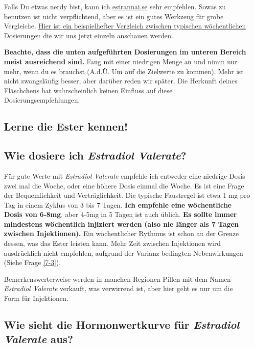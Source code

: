 \documentclass{article}
\begin{document}
{Falls Du etwas nerdy bist, kann ich \href{http://estrannai.se}{estrannai.se} sehr empfehlen. Sowas zu benutzen ist nicht verpflichtend, aber es ist ein gutes Werkzeug für grobe Vergleiche. \href{https://estrannai.se/\#i0__cu,7,7,1-cu,5,7,3-cu,5,7,2}{Hier ist ein beispielhefter Vergleich zwischen typischen wöchentlichen Dosierungen} die wir uns jetzt einzeln anschauen werden.

\textbf{Beachte, dass die unten aufgeführten Dosierungen im unteren Bereich meist ausreichend sind.} Fang mit einer niedrigen Menge an und nimm nur mehr, wenn du es brauchst (A.d.Ü. Um auf die Zielwerte zu kommen). Mehr ist nicht zwangsläufig besser, aber darüber reden wir später. Die Herkunft deines Fläschchens hat wahrscheinlich keinen Einfluss auf diese Dosierungsempfehlungen.

\subsection*{Lerne die Ester kennen!}

\subsection{Wie dosiere ich \textit{Estradiol Valerate}?}

Für gute Werte mit \textit{Estradiol Valerate} empfehle ich entweder eine niedrige Dosis zwei mal die Woche, oder eine höhere Dosis einmal die Woche. Es ist eine Frage der Bequemlichkeit und Verträglichkeit. Die typische Faustregel ist etwa 1 mg pro Tag in einem Zyklus von 3 bis 7 Tagen. \textbf{Ich empfehle eine wöchentliche Dosis von 6-8mg}, aber 4-5mg in  5 Tagen ist auch üblich. \textbf{Es sollte immer mindestens wöchentlich injiziert werden (also nie länger als 7 Tagen zwischen Injektionen).} Ein wöchentlicher Rythmus ist schon an der Grenze dessen, was das Ester leisten kann. Mehr Zeit zwischen Injektionen wird ausdrücklich nicht empfohlen, aufgrund der Varianz-bedingten Nebenwirkungen (Siehe Frage \ref{7-3}).

Bemerkenswerterweise werden in manchen Regionen Pillen mit dem Namen \textit{Estradiol Valerate} verkauft, was verwirrend ist, aber hier geht es nur um die Form für Injektionen.

\subsection{Wie sieht die Hormonwertkurve für \textit{Estradiol Valerate} aus?}

}
\end{document}
